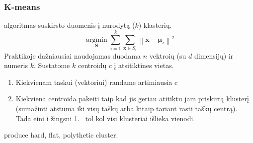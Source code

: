\documentclass{VUMIFInfKursinis}
\begin{document}
\subsubsection{K-means}
 algoritmas suskirsto duomenis į nurodytą ($ k $) klasterių. \[ \underset{\mathbf{S}} {\operatorname{\arg \min}}  \sum_{i=1}^{k} \sum_{\mathbf x \in S_i} \left\| \mathbf x - \boldsymbol\mu_i \right\|^2 \]
Praktikoje dažniausiai naudojamas duodama $n$ vektroių (su $d$ dimensijų) ir numeris $k$.  Sustatome $k$ centroidų $c$ į atsitiktines vietas.
\begin{enumerate}
	\item Kiekvienam taskui (vektoriui) randame artimiausia c
	\item Kiekviena centroida pakeiti taip kad jis geriau atitiktu jam priskirtą klusterį (sumažinti atstuma iki visų taškų arba kitaip tariant rasti taškų centrą). Tada eini i žingsni  1.\ %
	tol kol visi klusteriai išlieka vienodi.
\end{enumerate}
 produce hard, flat, polythetic cluster. 

\end{document}
